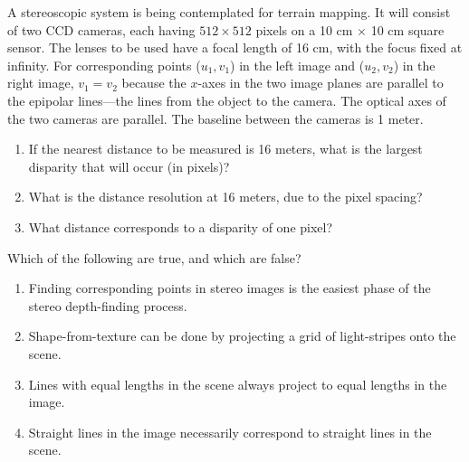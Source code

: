 \begin{exercise}
A stereoscopic system is being contemplated for terrain mapping. It
will consist of two CCD cameras, each having \({512}\times {512}\)
pixels on a 10 cm \(\times\) 10 cm square sensor.  The lenses to be
used have a focal length of 16 cm, with the focus fixed at
infinity. For corresponding points (\(u_1,v_1\)) in the left image and
(\(u_2,v_2\)) in the right image, \(v_1=v_2\) because the \(x\)-axes
in the two image planes are parallel to the epipolar lines---the lines
from the object to the camera.  The optical axes of the two cameras
are parallel. The baseline between the cameras is 1 meter.
\begin{enumerate}
\item If the nearest distance to be measured is 16 meters, what is the largest
disparity that will occur (in pixels)?

\item  What is the distance resolution at 16 meters, due to the pixel spacing?

\item  What distance corresponds to a disparity of one pixel?
\end{enumerate}
\end{exercise} 


\begin{uexercise}
Which of the following are true, and which are false?
\begin{enumerate}
\item Finding corresponding points in stereo images is the easiest phase of
the stereo depth-finding process.
\item Shape-from-texture can be done by projecting a grid of light-stripes
onto the scene.
\item  Lines with equal lengths in the scene  always project to equal
lengths in the image.
\item  Straight lines in the image necessarily correspond to straight lines 
in the scene.
\end{enumerate}
\end{uexercise} 

